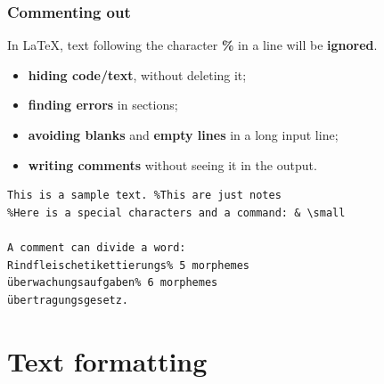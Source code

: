 \begin{frame}[fragile]
\frametitle{Commenting out}

In \LaTeX , text following the character \textbf{\%} in a line will be \textbf{ignored}.

\begin{itemize}
\item \textbf{hiding code/text}, without deleting it;

\item \textbf{finding errors} in sections;

\item \textbf{avoiding blanks} and \textbf{empty lines} in a long input line;

\item \textbf{writing comments} without seeing it in the output.

\end{itemize}

\begin{lstlisting}
This is a sample text. %This are just notes
%Here is a special characters and a command: & \small

A comment can divide a word:
Rindfleischetikettierungs% 5 morphemes
überwachungsaufgaben% 6 morphemes
übertragungsgesetz. 
\end{lstlisting}


\end{frame}


\section{Text formatting}

